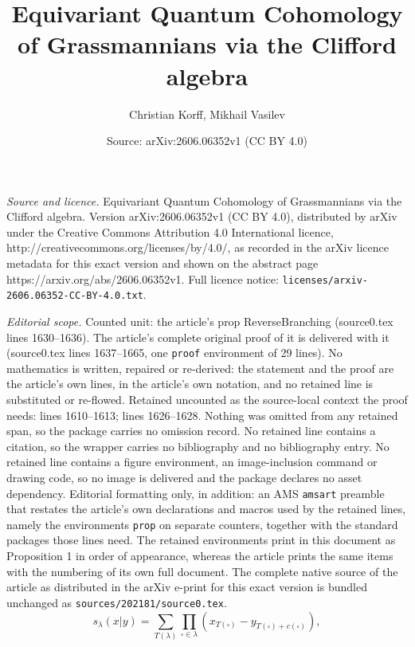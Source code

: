 \documentclass[10pt,a4paper]{amsart}
\title{Equivariant Quantum Cohomology of Grassmannians via the Clifford algebra}
\author{Christian Korff, Mikhail Vasilev}
\date{Source: arXiv:2606.06352v1 (CC BY 4.0)}
\begin{document}
\maketitle

\noindent\emph{Source and licence.} Equivariant Quantum Cohomology of Grassmannians via the Clifford algebra. Version arXiv:2606.06352v1 (CC BY 4.0), distributed by arXiv under the Creative Commons Attribution 4.0 International licence, http://creativecommons.org/licenses/by/4.0/, as recorded in the arXiv licence metadata for this exact version and shown on the abstract page https://arxiv.org/abs/2606.06352v1. Full licence notice: \texttt{licenses/arxiv-2606.06352-CC-BY-4.0.txt}.\par\smallskip

\noindent\textit{Editorial scope.} Counted unit: the article's prop ReverseBranching (source0.tex lines 1630--1636). The article's complete original proof of it is delivered with it (source0.tex lines 1637--1665, one \texttt{proof} environment of 29 lines). No mathematics is written, repaired or re-derived: the statement and the proof are the article's own lines, in the article's own notation, and no retained line is substituted or re-flowed.  Retained uncounted as the source-local context the proof needs: lines 1610--1613; lines 1626--1628.  Nothing was omitted from any retained span, so the package carries no omission record.  No retained line contains a citation, so the wrapper carries no bibliography and no bibliography entry.  No retained line contains a figure environment, an image-inclusion command or drawing code, so no image is delivered and the package declares no asset dependency.  Editorial formatting only, in addition: an AMS \texttt{amsart} preamble that restates the article's own declarations and macros used by the retained lines, namely the environments \texttt{prop} on separate counters, together with the standard packages those lines need.  The retained environments print in this document as Proposition 1 in order of appearance, whereas the article prints the same items with the numbering of its own full document.  The complete native source of the article as distributed in the arXiv e-print for this exact version is bundled unchanged as \texttt{sources/202181/source0.tex}.
\begin{equation}
    \label{tablformula}
    s_{\lambda}(x|y) = \sum\limits_{T(\lambda)}   \prod\limits_{\square \in \lambda} (x_{T(\square)} - y_{T(\square) + c(\square)}),
\end{equation}
\end{document}

